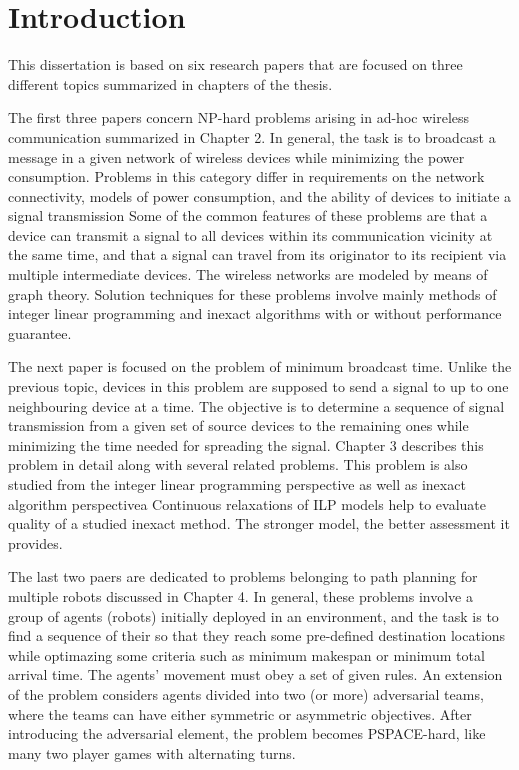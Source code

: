 
%
%
\newtheorem{theorem}{\textbf{Theorem}}
\newtheorem{remark}[theorem]{\textbf{Remark}}

\chapter{Introduction}
%
This dissertation is based on six research papers that are focused on three different topics summarized in chapters of the thesis.

The first three papers concern NP-hard problems arising in ad-hoc wireless communication summarized in Chapter 2.
In general, the task is to broadcast a message in a given network of wireless devices while minimizing the power consumption.
Problems in this category differ in requirements on the network connectivity, models of power consumption, and the ability of devices to initiate a signal transmission
Some of the common features of these problems are that a device can transmit a signal to all devices within its communication vicinity at the same time,
and that a signal can travel from its originator to its recipient via multiple intermediate devices.
The wireless networks are modeled by means of graph theory.
Solution techniques for these problems involve mainly methods of integer linear programming and inexact algorithms with or without performance guarantee.

The next paper is focused on the problem of minimum broadcast time.
Unlike the previous topic, devices in this problem are supposed to send a signal to up to one neighbouring device at a time.
The objective is to determine a sequence of signal transmission from a given set of source devices to the remaining ones while minimizing the time needed for spreading the signal.
Chapter 3 describes this problem in detail along with several related problems.
This problem is also studied from the integer linear programming perspective as well as inexact algorithm perspectivea
Continuous relaxations of ILP models help to evaluate quality of a studied inexact method.
The stronger model, the better assessment it provides.

The last two paers are dedicated to problems belonging to path planning for multiple robots discussed in Chapter 4.
In general, these problems involve a group of agents (robots) initially deployed in an environment, and the task is to find a sequence of their 
so that they reach some pre-defined destination locations while optimazing some criteria such as minimum makespan or minimum total arrival time.
The agents' movement must obey a set of given rules.
An extension of the problem considers agents divided into two (or more) adversarial teams, where the teams can have either symmetric or asymmetric objectives.
After introducing the adversarial element, the problem becomes PSPACE-hard, like many two player games with alternating turns.

